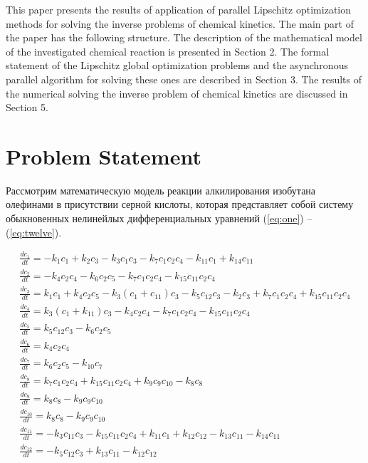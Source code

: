 \documentclass{svproc}
\begin{document}
This paper presents the results of application of parallel Lipschitz optimization methods for solving the inverse problems of chemical kinetics. The main part of the paper has the following structure. The description of the mathematical model of the investigated chemical reaction is presented in Section 2. The formal statement of the Lipschitz global optimization problems and the asynchronous parallel algorithm for solving these ones are described in Section 3. The results of the numerical solving the inverse problem of chemical kinetics are discussed in Section 5.

\section{Problem Statement}\label{Sec_math_mod}

Рассмотрим математическую модель реакции алкилирования изобутана олефинами в присутствии серной кислоты, которая представляет собой систему обыкновенных нелинейлых дифференциальных уравнений (\ref{eq:one}) -- (\ref{eq:twelve}).

\begin{gather}
  \frac{dc_1}{dt} = -k_1c_1 + k_2c_3 - k_3c_1c_3 - k_7c_1c_2c_4 - k_{11}c_1 + k_{14}c_{11} \label{eq:one} \\
  \frac{dc_2}{dt} = -k_4c_2c_4 - k_6c_2c_5 - k_7c_1c_2c_4 - k_{15}c_{11}c_2c_4 \label{eq:two} \\
  \frac{dc_3}{dt} = k_1c_1 + k_4c_2c_5 - k_3(c_1 + c_{11})c_3 - k_{5}c_{12}c_3 - k_2c_3 + k_7c_1c_2c_4 + k_{15}c_{11}c_2c_4 \label{eq:three} \\
  \frac{dc_4}{dt} = k_3(c_1 + k_{11})c_3 - k_4c_2c_4 - k_{7}c_{1}c_2c_4 - k_{15}c_{11}c_2c_4 \label{eq:four} \\
  \frac{dc_5}{dt} = k_5c_{12}c_3 - k_{6}c_2c_5 \label{eq:five} \\
  \frac{dc_6}{dt} = k_4c_{2}c_4 \label{eq:six} \\
  \frac{dc_7}{dt} = k_6c_{2}c_5 - k_{10}c_7 \label{eq:seven} \\
  \frac{dc_8}{dt} = k_7c_{1}c_2c_4 + k_{15}c_{11}c_2c_4 + k_9c_9c_{10} - k_8c_8 \label{eq:eight} \\
  \frac{dc_9}{dt} = k_8c_{8} - k_{9}c_{9}c_{10} \label{eq:nine} \\
  \frac{dc_{10}}{dt} = k_8c_{8} - k_{9}c_{9}c_{10} \label{eq:ten} \\
  \frac{dc_{11}}{dt} = -k_3c_{11}c_3 - k_{15}c_{11}c_{2}c_4 + k_{11}c_1 + k_{12}c_{12} - k_{13}c_{11} - k_{14}c_{11} \label{eq:eleven} \\
  \frac{dc_{12}}{dt} = -k_5c_{12}c_3 + k_{13}c_{11} - k_{12}c_{12} \label{eq:twelve} 
\end{gather}
\end{document}
